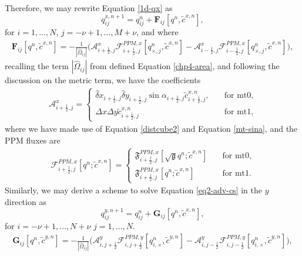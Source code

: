 Therefore, we may rewrite Equation \eqref{1d-qx} as
\begin{equation}
q^{x,n+1}_{ij} = q^{n}_{ij} + \mathbf{F}_{ij}[{q^n,\tilde{c}^{x,n}}],
\end{equation}
for $i=1, \ldots, N$, $j=-\nu+1, \ldots, M + \nu$, and where
\begin{align*}
	\mathbf{F}_{ij}[{q^n,\tilde{c}^{x,n}}] = 
	-\frac{1}{|\hat{\Omega}_{ij}|}
	\bigg(\mathcal{A}_{i+\frac{1}{2},j}^{x} \mathcal{F}_{i+\frac{1}{2},j}^{PPM,x}[q^n_{\times,j},\tilde{c}^{x,n}]-
	\mathcal{A}_{i-\frac{1}{2},j}^{x} \mathcal{F}_{i-\frac{1}{2},j}^{PPM,x}[q^n_{\times,j},\tilde{c}^{x,n}] \bigg),
\end{align*}
recalling the term $|\hat{\Omega}_{ij}|$ from defined Equation \eqref{chp4-area},
and following the discussion on the metric term, we have the coefficients
\begin{align}
	\mathcal{A}_{i+\frac{1}{2},j}^x= 
	\begin{cases}
		\hat{\delta} x_{i+\frac{1}{2},j}  \hat{\delta} y_{i+\frac{1}{2},j} 
		\sin{\alpha_{i+\frac{1}{2},j}}
		{\tilde{c}}_{i+\frac{1}{2},j}^{x,n},
		\quad &\text{for mt0},\\
		{\Delta x}{\Delta y}{\tilde{c}}_{i+\frac{1}{2},j}^{x,n}
		\quad &\text{for mt1},
	\end{cases}
\end{align}
where we have made use of Equation \eqref{distcube2} and Equation \eqref{mt-sina}, 
and the PPM fluxes are
\begin{align}
	\mathcal{F}_{i+\frac{1}{2},j}^{PPM,x} [{{q}^n;\tilde{c}^{x,n}}] = 
	\begin{cases}
		\mathfrak{F}_{i+\frac{1}{2},j}^{PPM,x}[{{\sqrt{\mathfrak{g}}q}^n;\tilde{c}^{x,n}}]
		\quad &\text{for mt0},\\
		\mathfrak{F}_{i+\frac{1}{2},j}^{PPM,x}[{{q}^n;\tilde{c}^{x,n}}]
		\quad &\text{for mt1}.
	\end{cases}
\end{align}
Similarly, we may derive a scheme to solve Equation \eqref{eq2-adv-cs} in the $y$ direction as
\begin{equation}
	q^{y,n+1}_{ij} = q^{n}_{ij} + \mathbf{G}_{ij}[{q^n,\tilde{c}^{x,n}}],
\end{equation}
for $i=-\nu+1, \ldots, N + \nu$  $j=1, \ldots, N$.
\begin{align*}
	\mathbf{G}_{ij}[{q^n,\tilde{c}^{y,n}}] = 
	-\frac{1}{|\hat{\Omega}_{ij}|}
	\bigg(\mathcal{A}_{i,j+\frac{1}{2}}^{y} \mathcal{F}_{i,j+\frac{1}{2}}^{PPM,y}[q^n_{i,\times},\tilde{c}^{y,n}]-
	\mathcal{A}_{i,j-\frac{1}{2}}^{y} \mathcal{F}_{i,j-\frac{1}{2}}^{PPM,y}[q^n_{i,\times},\tilde{c}^{y,n}] \bigg),
\end{align*}
